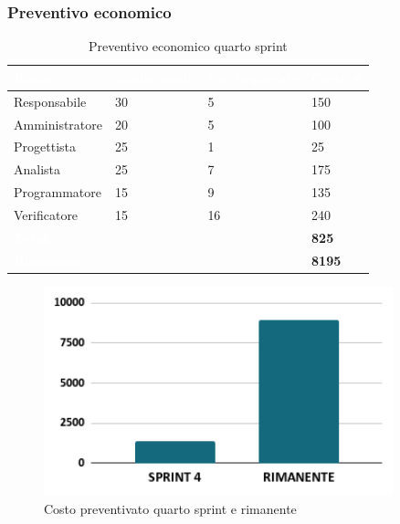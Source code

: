\subsubsection{Preventivo economico}
{
\setlength{\tabcolsep}{10pt}
\renewcommand{\arraystretch}{1.5}
\begin{table}[h]
    \centering
    \begin{tabularx}{\textwidth}{| l | l | l | X |}
        \hline
        \rowcolor{headerrow} \textbf{\textcolor{white}{Ruolo}} & \textbf{\textcolor{white}{Costo orario}} & \textbf{\textcolor{white}{Ore impiegate}} & \textbf{\textcolor{white}{Costo €}} \\
        \hline
        Responsabile & 30 & 5 & 150\\
        \hline
        Amministratore & 20 & 5 & 100\\
        \hline
        Progettista& 25 & 1 & 25\\
        \hline
        Analista & 25 & 7 & 175\\
        \hline
        Programmatore & 15 & 9 & 135\\
        \hline
        Verificatore & 15 & 16 & 240\\
        \hline
        \cellcolor{headerrow} \textbf{\textcolor{white}{Totale}} &  &  & \textbf{825}\\
        \hline
        \cellcolor{headerrow} \textbf{\textcolor{white}{Rimanente}} &  &  & \textbf{8195}\\
        \hline
    \end{tabularx}
    \caption{Preventivo economico quarto sprint}
    \label{tab:preventivocostiquartosprint}
\end{table}
}

\begin{figure}[h!]
    \centering
    \includegraphics[width=0.9\textwidth]{prev4costo.png}
    \caption{Costo preventivato quarto sprint e rimanente}
    \label{fig:preventivocostoquartosprint}
\end{figure}

